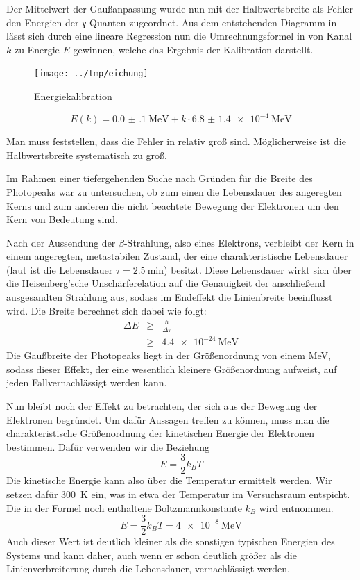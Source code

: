 Der Mittelwert der Gaußanpassung wurde nun mit der Halbwertsbreite als Fehler
den Energien der γ-Quanten zugeordnet. Aus dem entstehenden Diagramm in
 lässt sich durch eine lineare Regression nun die
Umrechnungsformel in  von Kanal $k$ zu Energie $E$ gewinnen,
welche das Ergebnis der Kalibration darstellt.

\begin{figure}[htb]
      \centering
      \texttt{[image: ../tmp/eichung]}
      \caption{Energiekalibration}
      \label{fig:eichung}
\end{figure}

\begin{equation}
 E(k) = \SI{0.0(1)}{\mega\eV} + k\cdot\SI{6.8(14)e-4}{\mega\eV}
 \label{eqn:eichung}
\end{equation}

Man muss feststellen, dass die Fehler in  relativ groß sind.
Möglicherweise ist die Halbwertsbreite systematisch zu groß.

Im Rahmen einer tiefergehenden Suche nach Gründen für die Breite des Photopeaks
war zu untersuchen, ob zum einen die Lebensdauer des angeregten Kerns und zum
anderen die nicht beachtete Bewegung der Elektronen um den Kern von Bedeutung
sind.

Nach der Aussendung der $\beta$-Strahlung, also eines Elektrons, verbleibt der
Kern in einem angeregten, metastabilen Zustand, der eine charakteristische
Lebensdauer (laut \cite[Abb. 4]{script} ist die Lebensdauer $\tau =
\SI{2,5}{\minute}$) besitzt. Diese Lebensdauer wirkt sich über die
Heisenberg'sche Unschärferelation auf die Genauigkeit der anschließend
ausgesandten Strahlung aus, sodass im Endeffekt die Linienbreite beeinflusst
wird. Die Breite berechnet sich dabei wie folgt:
\begin{eqnarray}
\Delta E &\geq& \frac{\hbar}{\Delta \tau}\\
&\geq& \SI{4,4e-24}{\mega\eV}
\end{eqnarray}
Die Gaußbreite der Photopeaks liegt in der Größenordnung von einem MeV, sodass
dieser Effekt, der eine wesentlich kleinere Größenordnung aufweist, auf jeden
Fallvernachlässigt werden kann.

Nun bleibt noch der Effekt zu betrachten, der sich aus der Bewegung der
Elektronen begründet. Um dafür Aussagen treffen zu können, muss man die
charakteristische Größenordnung der kinetischen Energie der Elektronen
bestimmen. Dafür verwenden wir die Beziehung
\begin{equation}
E = \frac{3}{2}k_BT
\end{equation}
Die kinetische Energie kann also über die Temperatur ermittelt werden. Wir
setzen dafür \SI{300}{\kelvin} ein, was in etwa der Temperatur im Versuchsraum
entspicht. Die in der Formel noch enthaltene Boltzmannkonstante $k_B$ wird
\cite{pdb} entnommen.
\begin{equation}
E = \frac{3}{2}k_BT = \SI{4e-8}{\mega\eV}
\end{equation}
Auch dieser Wert ist deutlich kleiner als die sonstigen typischen Energien des
Systems und kann daher, auch wenn er schon deutlich größer als die
Linienverbreiterung durch die Lebensdauer, vernachlässigt werden.

